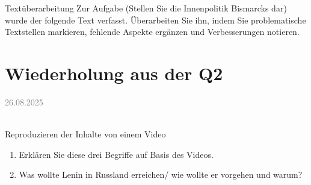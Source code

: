 \documentclass[11pt,a4paper,oneside]{article}
\newcommand{\lessondate}[1]{
	\noindent\hfill\textcolor{gray}{\textsc{#1}} \\
	\vspace{0.5cm}
}
\begin{document}
	\begin{histaufgabe}{Textüberarbeitung}
		Zur Aufgabe (Stellen Sie die Innenpolitik Bismarcks dar) wurde der folgende Text verfasst. Überarbeiten Sie ihn, indem Sie problematische Textstellen markieren, fehlende Aspekte ergänzen und Verbesserungen notieren.
	\end{histaufgabe}
	
	
	\newpage
	
	
	\section{Wiederholung aus der Q2}
	
	\lessondate{26.08.2025}\\

		
	\begin{histaufgabe}{Reproduzieren der Inhalte von einem Video}
		\begin{enumerate}
			\item Erklären Sie diese drei Begriffe auf Basis des Videos.
			\item Was wollte Lenin in Russland erreichen/ wie wollte er vorgehen und warum?
		\end{enumerate}
	\end{histaufgabe}
	
\end{document}
